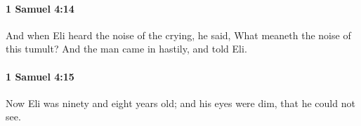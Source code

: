 		\paragraph{1 Samuel 4:14} %
			\label{1SAMUEL-4-14}

			And when Eli heard the noise of the crying, he said, What meaneth the noise of this tumult? And the man came in hastily, and told Eli.


		\paragraph{1 Samuel 4:15} %
			\label{1SAMUEL-4-15}

			Now Eli was ninety and eight years old; and his eyes were dim, that he could not see.


